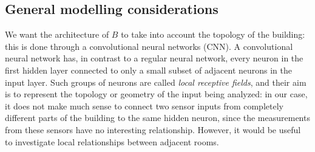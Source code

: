 \documentclass{article}
\theoremstyle{definition}
\theoremstyle{remark}
\begin{document}
\subsection{General modelling considerations}
We want the architecture of $B$ to take into account the topology of the building: this is done through a convolutional neural networks (CNN). A convolutional neural network has, in contrast to a regular neural network, every neuron in the first hidden layer connected to only a small subset of adjacent neurons in the input layer. Such groups of neurons are called \textit{local receptive fields}, and their aim is to represent the topology or geometry of the input being analyzed: in our case, it does not make much sense to connect two sensor inputs from completely different parts of the building to the same hidden neuron, since the measurements from these sensors have no interesting relationship. However, it would be useful to investigate local relationships between adjacent rooms. 
\end{document}
